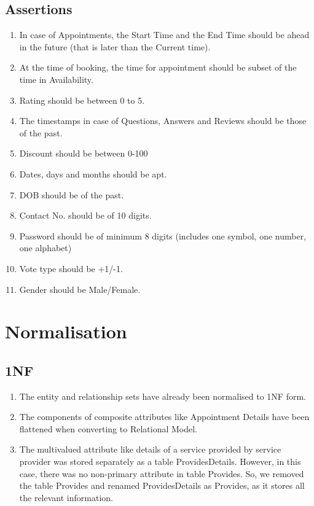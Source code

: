 \documentclass[a4paper]{article}
\begin{document}
\subsection{Assertions}
\begin{enumerate}
\item In case of Appointments, the Start Time and the End Time should be ahead in the future (that is later than the Current time).
\item At the time of booking, the time for appointment should be subset of the time in Availability.
\item Rating should be between 0 to 5.
\item The timestamps in case of Questions, Answers and Reviews should be those of the past.
\item Discount should be between 0-100%
\item Dates, days and months should be apt.
\item DOB should be of the past.
\item Contact No. should be of 10 digits.
\item Password should be of minimum 8 digits (includes one symbol, one number, one alphabet)
\item Vote type should be +1/-1. 
\item Gender should be Male/Female.
\end{enumerate}

\section{Normalisation}



\subsection{1NF}
\begin{enumerate}
\item The entity and relationship sets have already been normalised to 1NF form.
\item The components of composite attributes like Appointment Details have been flattened when converting to Relational Model.
\item The multivalued attribute like details of a service provided by service provider was stored separately as a table ProvidesDetails. However, in this case, there was no non-primary attribute in table Provides. So, we removed the table Provides and renamed ProvidesDetails as Provides, as it stores all the relevant information.

\end{enumerate}
\end{document}
